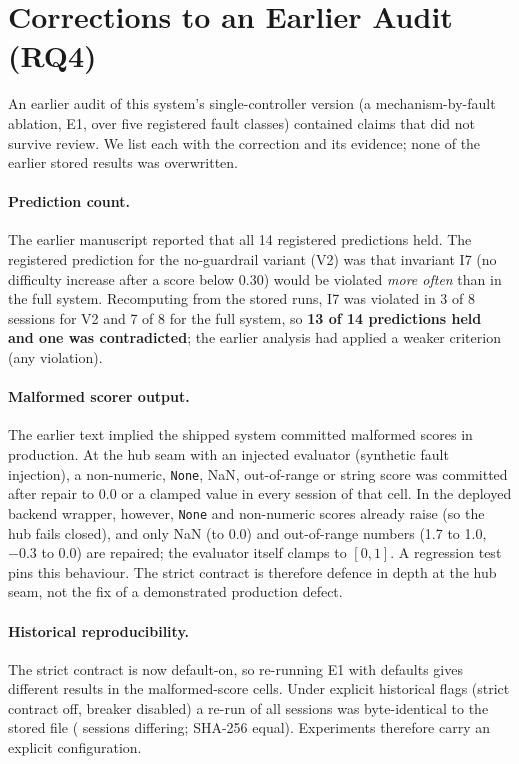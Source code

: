\section{Corrections to an Earlier Audit (RQ4)}\label{sec:carry}
An earlier audit of this system's single-controller version (a mechanism-by-fault ablation, E1, over five registered fault classes) contained claims that did not survive review. We list each with the correction and its evidence; none of the earlier stored results was overwritten.
\paragraph{Prediction count.} The earlier manuscript reported that all 14 registered predictions held. The registered prediction for the no-guardrail variant (V2) was that invariant I7 (no difficulty increase after a score below 0.30) would be violated \emph{more often} than in the full system. Recomputing from the stored runs, I7 was violated in 3 of 8 sessions for V2 and 7 of 8 for the full system, so \textbf{13 of 14 predictions held and one was contradicted}; the earlier analysis had applied a weaker criterion (any violation).
\paragraph{Malformed scorer output.} The earlier text implied the shipped system committed malformed scores in production. At the hub seam with an injected evaluator (synthetic fault injection), a non-numeric, \texttt{None}, NaN, out-of-range or string score was committed after repair to 0.0 or a clamped value in every session of that cell. In the deployed backend wrapper, however, \texttt{None} and non-numeric scores already raise (so the hub fails closed), and only NaN (to 0.0) and out-of-range numbers (1.7 to 1.0, $-0.3$ to 0.0) are repaired; the evaluator itself clamps to $[0,1]$. A regression test pins this behaviour. The strict contract is therefore defence in depth at the hub seam, not the fix of a demonstrated production defect.
\paragraph{Historical reproducibility.} The strict contract is now default-on, so re-running E1 with defaults gives different results in the malformed-score cells. Under explicit historical flags (strict contract off, breaker disabled) a re-run of all \xeEoneRows{} sessions was byte-identical to the stored file (\xeEoneDiff{} sessions differing; SHA-256 equal). Experiments therefore carry an explicit configuration.

